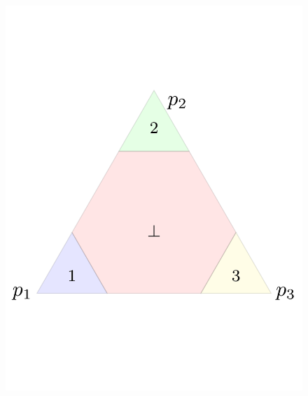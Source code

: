 \documentclass[anon,12pt]{colt2021} %
\begin{document}
\begin{figure}
	\centering
	\begin{minipage}{.32\textwidth}
		\centering
		\includegraphics[width=\linewidth]{figs/abstain-alpha-point3.pdf}
	\end{minipage}%
\hfill
	\begin{minipage}{.32\textwidth}
	\centering

\end{minipage}
\end{figure}
\end{document}
